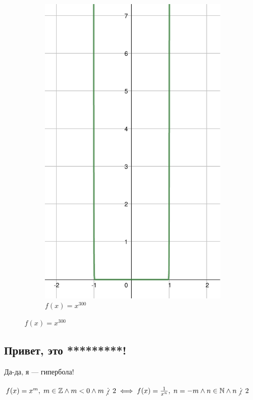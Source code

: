 \begin{figure}[h]
\begin{subfigure}{0.35\textwidth}
        \includegraphics[width=\textwidth]{tex/chapter_1/assets/y=x^300.pdf}
        \caption*{$f(x) = x^{300}$}
    \end{subfigure}
\end{figure}

\subsection{Привет, это *********!}

Да-да, я --- гипербола!

$f(x) = x^m, \; m \in \mathbb{Z} \land m < 0 \land m \notdivisible 2 \iff f(x) = \frac{1}{x^n}, \; n = -m \land n \in \mathbb{N} \land n \notdivisible 2$ \\

